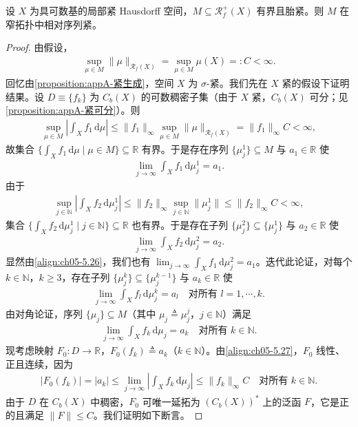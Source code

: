 \documentclass[../../main.tex]{subfiles}%
\begin{document}
\begin{proposition}\label{proposition:ch05-有界胎紧紧}
设 $X$ 为具可数基的局部紧 Hausdorff 空间，$M\subseteq\mathscr{R}^+_f(X)$ 有界且胎紧。则 $M$ 在窄拓扑中相对序列紧。
\end{proposition}

\begin{proof}
由假设，
\begin{align}
\sup_{\mu\in M}\|\mu\|_{\mathscr{R}_f(X)}
=\sup_{\mu\in M}\mu(X)=:C<\infty.\label{align:ch05-5.25}
\end{align}
回忆由\cref{proposition:appA-紧生成}，空间 $X$ 为 $\sigma$-紧。我们先在 $X$ 紧的假设下证明结果。设 $D\equiv\{f_k\}$ 为 $C_b(X)$ 的可数稠密子集（由于 $X$ 紧，$C_b(X)$ 可分；见\cref{proposition:appA-紧可分}）。则
\begin{align*}
\sup_{\mu\in M}\left|\int_X f_1\,\mathrm{d}\mu\right|
\leqslant\|f_1\|_\infty\sup_{\mu\in M}\|\mu\|_{\mathscr{R}_f(X)}
=\|f_1\|_\infty C<\infty,
\end{align*}
故集合 $\{\int_X f_1\,\mathrm{d}\mu\mid\mu\in M\}\subseteq\mathbb{R}$ 有界。于是存在序列 $\{\mu_j^1\}\subseteq M$ 与 $a_1\in\mathbb{R}$ 使
\begin{align}
\lim_{j\to\infty}\int_X f_1\,\mathrm{d}\mu_j^1=a_1.\label{align:ch05-5.26}
\end{align}
由于
\begin{align*}
\sup_{j\in\mathbb{N}}\left|\int_X f_2\,\mathrm{d}\mu_j^1\right|
\leqslant\|f_2\|_\infty\sup_{j\in\mathbb{N}}\|\mu_j^1\|
\leqslant\|f_2\|_\infty C<\infty,
\end{align*}
集合 $\{\int_X f_2\,\mathrm{d}\mu_j^1\mid j\in\mathbb{N}\}\subseteq\mathbb{R}$ 也有界。于是存在子列 $\{\mu_j^2\}\subseteq\{\mu_j^1\}$ 与 $a_2\in\mathbb{R}$ 使
\begin{align*}
\lim_{j\to\infty}\int_X f_2\,\mathrm{d}\mu_j^2=a_2.
\end{align*}
显然由\eqref{align:ch05-5.26}，我们也有 $\lim_{j\to\infty}\int_X f_1\,\mathrm{d}\mu_j^2=a_1$。迭代此论证，对每个 $k\in\mathbb{N}$，$k\geqslant3$，存在子列 $\{\mu_j^k\}\subseteq\{\mu_j^{k-1}\}$ 与 $a_k\in\mathbb{R}$ 使
\begin{align*}
\lim_{j\to\infty}\int_X f_l\,\mathrm{d}\mu_j^k=a_l
\quad\text{对所有 }l=1,\cdots ,k.
\end{align*}
由对角论证，序列 $\{\mu_j\}\subseteq M$（其中 $\mu_j\triangleq \mu_j^j$，$j\in\mathbb{N}$）满足
\begin{align}
\lim_{j\to\infty}\int_X f_k\,\mathrm{d}\mu_j=a_k
\quad\text{对所有 }k\in\mathbb{N}.\label{align:ch05-5.27}
\end{align}
现考虑映射 $F_0:D\to\mathbb{R}$，$F_0(f_k)\triangleq a_k$（$k\in\mathbb{N}$）。由\eqref{align:ch05-5.27}，$F_0$ 线性、正且连续，因为
\begin{align*}
|F_0(f_k)|=|a_k|
\leqslant\lim_{j\to\infty}\left|\int_X f_k\,\mathrm{d}\mu_j\right|
\leqslant\|f_k\|_\infty C
\quad\text{对所有 }k\in\mathbb{N}.
\end{align*}
由于 $D$ 在 $C_b(X)$ 中稠密，$F_0$ 可唯一延拓为 $(C_b(X))^*$ 上的泛函 $F$，它是正的且满足 $\|F\|\leqslant C$。我们证明如下断言。


\end{proof}
\end{document}
